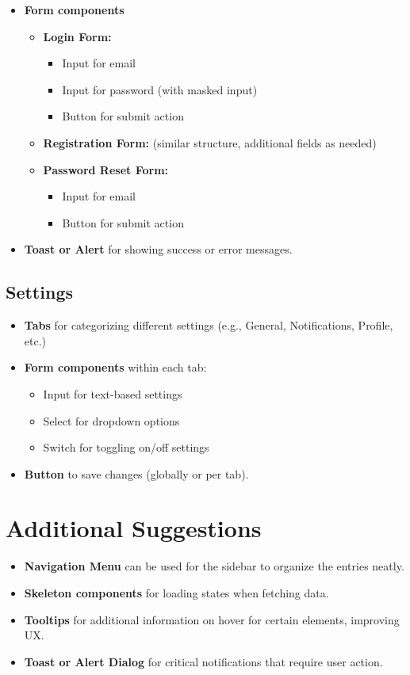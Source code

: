 \documentclass{article}
\begin{document}
\begin{itemize}
\item \textbf{Form components}
\begin{itemize}
\item \textbf{Login Form:}
\begin{itemize}
\item Input for email
\item Input for password (with masked input)
\item Button for submit action
\end{itemize}
\item \textbf{Registration Form:} (similar structure, additional fields as needed)
\item \textbf{Password Reset Form:}
\begin{itemize}
\item Input for email
\item Button for submit action
\end{itemize}
\end{itemize}
\item \textbf{Toast or Alert} for showing success or error messages.
\end{itemize}

\subsection{Settings}

\begin{itemize}
\item \textbf{Tabs} for categorizing different settings (e.g., General, Notifications, Profile, etc.)
\item \textbf{Form components} within each tab:
\begin{itemize}
\item Input for text-based settings
\item Select for dropdown options
\item Switch for toggling on/off settings
\end{itemize}
\item \textbf{Button} to save changes (globally or per tab).
\end{itemize}

\section{Additional Suggestions}

\begin{itemize}
    \item \textbf{Navigation Menu} can be used for the sidebar to organize the entries neatly.
    \item \textbf{Skeleton components} for loading states when fetching data.
    \item \textbf{Tooltips} for additional information on hover for certain elements, improving UX. 
    \item \textbf{Toast or Alert Dialog} for critical notifications that require user action.

\end{itemize}
\end{document}

